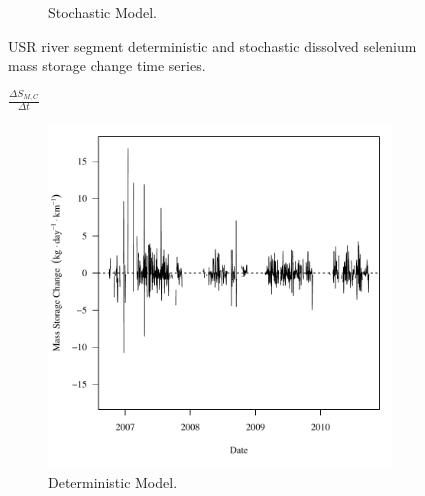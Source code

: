 \begin{landscape}
\begin{figure}
\begin{subfigure}{0.7\textwidth}
			\caption{Stochastic Model.}
		\end{subfigure}
		\caption{USR river segment deterministic and stochastic dissolved selenium mass storage change time series.}
	\end{figure}
\end{landscape}

\subfiguremid
\begin{landscape}
	\begin{figure}
		$ \displaystyle \frac{\Delta S_{M,C}}{\Delta t} $
		\begin{subfigure}{0.7\textwidth}
			\centering
			\includegraphics[width=\tableCustomSize]{"Figures/Results_USR/Deterministic/f Segment C"}
			\caption{Deterministic Model.}
		\end{subfigure}%
		\begin{subfigure}{0.7\textwidth}
			\centering

\end{subfigure}
\end{figure}
\end{landscape}
